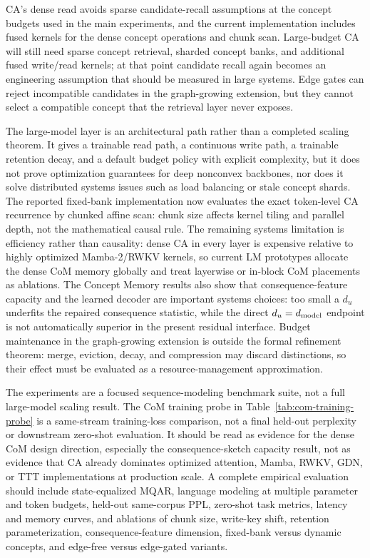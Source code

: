 CA's dense read avoids sparse candidate-recall assumptions at the concept budgets used in the main experiments, and the current implementation includes fused kernels for the dense concept operations and chunk scan. Large-budget CA will still need sparse concept retrieval, sharded concept banks, and additional fused write/read kernels; at that point candidate recall again becomes an engineering assumption that should be measured in large systems. Edge gates can reject incompatible candidates in the graph-growing extension, but they cannot select a compatible concept that the retrieval layer never exposes.

The large-model layer is an architectural path rather than a completed scaling theorem. It gives a trainable read path, a continuous write path, a trainable retention decay, and a default budget policy with explicit complexity, but it does not prove optimization guarantees for deep nonconvex backbones, nor does it solve distributed systems issues such as load balancing or stale concept shards. The reported fixed-bank implementation now evaluates the exact token-level CA recurrence by chunked affine scan: chunk size affects kernel tiling and parallel depth, not the mathematical causal rule. The remaining systems limitation is efficiency rather than causality: dense CA in every layer is expensive relative to highly optimized Mamba-2/RWKV kernels, so current LM prototypes allocate the dense CoM memory globally and treat layerwise or in-block CoM placements as ablations. The Concept Memory results also show that consequence-feature capacity and the learned decoder are important systems choices: too small a $d_u$ underfits the repaired consequence statistic, while the direct $d_u=d_{\rm model}$ endpoint is not automatically superior in the present residual interface. Budget maintenance in the graph-growing extension is outside the formal refinement theorem: merge, eviction, decay, and compression may discard distinctions, so their effect must be evaluated as a resource-management approximation.

The experiments are a focused sequence-modeling benchmark suite, not a full large-model scaling result. The CoM training probe in Table~\ref{tab:com-training-probe} is a same-stream training-loss comparison, not a final held-out perplexity or downstream zero-shot evaluation. It should be read as evidence for the dense CoM design direction, especially the consequence-sketch capacity result, not as evidence that CA already dominates optimized attention, Mamba, RWKV, GDN, or TTT implementations at production scale. A complete empirical evaluation should include state-equalized MQAR, language modeling at multiple parameter and token budgets, held-out same-corpus PPL, zero-shot task metrics, latency and memory curves, and ablations of chunk size, write-key shift, retention parameterization, consequence-feature dimension, fixed-bank versus dynamic concepts, and edge-free versus edge-gated variants.
